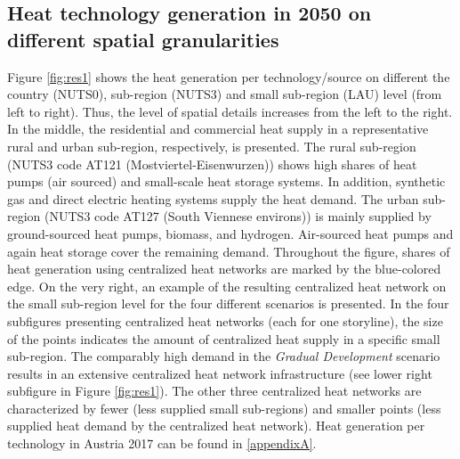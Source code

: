 \subsection{Heat technology generation in 2050 on different spatial granularities}\label{res:2}
Figure \ref{fig:res1} shows the heat generation per technology/source on different the country (NUTS0), sub-region (NUTS3) and small sub-region (LAU) level (from left to right). Thus, the level of spatial details increases from the left to the right. In the middle, the residential and commercial heat supply in a representative rural and urban sub-region, respectively, is presented. The rural sub-region (NUTS3 code AT121 (Mostviertel-Eisenwurzen)) shows high shares of heat pumps (air sourced) and small-scale heat storage systems. In addition, synthetic gas and direct electric heating systems supply the heat demand. The urban sub-region (NUTS3 code AT127 (South Viennese environs)) is mainly supplied by ground-sourced heat pumps, biomass, and hydrogen. Air-sourced heat pumps and again heat storage cover the remaining demand. Throughout the figure, shares of heat generation using centralized heat networks are marked by the blue-colored edge. On the very right, an example of the resulting centralized heat network on the small sub-region level for the four different scenarios is presented. In the four subfigures presenting centralized heat networks (each for one storyline), the size of the points indicates the amount of centralized heat supply in a specific small sub-region. The comparably high demand in the \textit{Gradual Development} scenario results in an extensive centralized heat network infrastructure (see lower right subfigure in Figure \ref{fig:res1}). The other three centralized heat networks are characterized by fewer (less supplied small sub-regions) and smaller points (less supplied heat demand by the centralized heat network). Heat generation per technology in Austria 2017 can be found in \ref{appendixA}.


